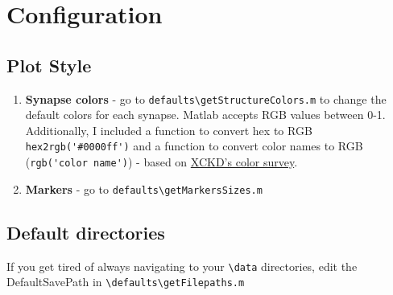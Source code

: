 \documentclass[]{exam}
\begin{document}
	\section{Configuration}
		\subsection{Plot Style}
		\begin{enumerate}
			\item \textbf{Synapse colors} - go to \verb|defaults\getStructureColors.m| to change the default colors for each synapse. Matlab accepts RGB values between 0-1. Additionally, I included a function to convert hex to RGB  \verb|hex2rgb('#0000ff')| and a function to convert color names to RGB (\verb|rgb('color name')|) - based on \href{https://xkcd.com/color/rgb/}{XCKD's color survey}. 
			\item \textbf{Markers} - go to \verb|defaults\getMarkersSizes.m|
		\end{enumerate}
		\subsection{Default directories}
		If you get tired of always navigating to your \verb|\data| directories, edit the DefaultSavePath in \verb|\defaults\getFilepaths.m|
\end{document}
